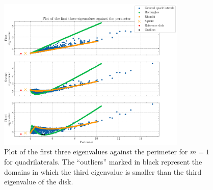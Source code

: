 \begin{figure}[!htb]
    \centering
    \begin{minipage}[c]{0.8\textwidth}
        \centering
        \includegraphics[width=0.8\textwidth]{Images/Dirac/quad/first_three_eigenvalues_quad_m_1.png}
        \caption{Plot of the first three eigenvalues against the perimeter for \(m=1\) for quadrilaterals. The ``outliers'' marked in black represent the domains in which the third eigenvalue is smaller than the third eigenvalue of the disk.}
        \label{dirac_first_three_eigenvalues_quad_m_1}
    \end{minipage}

    \vspace{0.5cm}


\end{figure}
